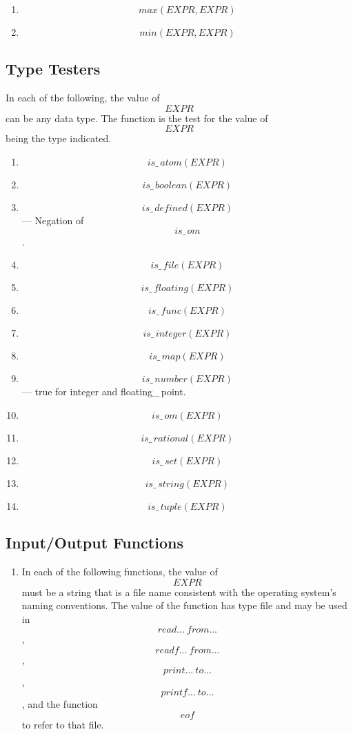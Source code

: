 {\begin{enumerate}
\begin{enumerate}
\item
\[max(EXPR,EXPR)\]

\item
\[min(EXPR,EXPR)\]
\end{enumerate}
\end{enumerate}



\pagebreak[0]
\subsection{Type Testers}

In each of the following, the value of \[EXPR\] can be any \ISETL{} data type.
The function is the test for the value of
\[EXPR\] being the type indicated.

\begin{enumerate}

\item \[is\_\,atom(EXPR)\]
\item \[is\_\,boolean(EXPR)\]
\item \[is\_\,defined(EXPR)\] ---  Negation of \[is\_\,om\].
\item \[is\_\,file(EXPR)\]
\item \[is\_\,floating(EXPR)\]
\item \[is\_\,func(EXPR)\]
\item \[is\_\,integer(EXPR)\]
\item \[is\_\,map(EXPR)\]
\item \[is\_\,number(EXPR)\] --- true for integer and floating\_\,point.
\item \[is\_\,om(EXPR)\]
\item \[is\_\,rational(EXPR)\]
\item \[is\_\,set(EXPR)\]
\item \[is\_\,string(EXPR)\]
\item \[is\_\,tuple(EXPR)\]
\end{enumerate}



\pagebreak[0]
\subsection{Input/Output Functions}\label{file-func}

\begin{enumerate}
\item
In each of the following functions,
the value of \[EXPR\] must be a string that
is a file name consistent with the operating system's naming conventions.
The value of the function has \ISETL{} type file
and may be used in 
\[read\ldots~from\ldots\],
\[readf\ldots~from\ldots\],
\[print\ldots~to\ldots\],
\[printf\ldots~to\ldots\],
and the function \[eof\] to refer to that file.


\end{enumerate}}
